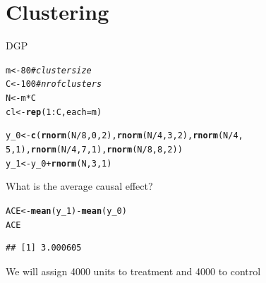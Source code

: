 \documentclass[12 pt]{article}\usepackage[]{graphicx}\usepackage[]{color}
\makeatletter
\newcommand{\hlnum}[1]{\textcolor[rgb]{0.686,0.059,0.569}{#1}}%
\newcommand{\hlcom}[1]{\textcolor[rgb]{0.678,0.584,0.686}{\textit{#1}}}%
\newcommand{\hlopt}[1]{\textcolor[rgb]{0,0,0}{#1}}%
\newcommand{\hlstd}[1]{\textcolor[rgb]{0.345,0.345,0.345}{#1}}%
\newcommand{\hlkwb}[1]{\textcolor[rgb]{0.69,0.353,0.396}{#1}}%
\newcommand{\hlkwc}[1]{\textcolor[rgb]{0.333,0.667,0.333}{#1}}%
\newcommand{\hlkwd}[1]{\textcolor[rgb]{0.737,0.353,0.396}{\textbf{#1}}}%
\newenvironment{kframe}{%
 \def\at@end@of@kframe{}%
 \ifinner\ifhmode%
  \def\at@end@of@kframe{\end{minipage}}%
  \begin{minipage}{\columnwidth}%
 \fi\fi%
 \def\FrameCommand##1{\hskip\@totalleftmargin \hskip-\fboxsep
 \colorbox{shadecolor}{##1}\hskip-\fboxsep
     \hskip-\linewidth \hskip-\@totalleftmargin \hskip\columnwidth}%
 \MakeFramed {\advance\hsize-\width
   \@totalleftmargin\z@ \linewidth\hsize
   \@setminipage}}%
 {\par\unskip\endMakeFramed%
 \at@end@of@kframe}
\newenvironment{knitrout}{}{} %
\makeatother
\begin{document}
\clearpage

\section*{Clustering}

DGP
\begin{knitrout}
\color{fgcolor}\begin{kframe}
\begin{alltt}
\hlstd{m} \hlkwb{<-} \hlnum{80}  \hlcom{# cluster size}
\hlstd{C} \hlkwb{<-} \hlnum{100}  \hlcom{# nr of clusters}
\hlstd{N} \hlkwb{<-} \hlstd{m} \hlopt{*} \hlstd{C}
\hlstd{cl} \hlkwb{<-} \hlkwd{rep}\hlstd{(}\hlnum{1}\hlopt{:}\hlstd{C,} \hlkwc{each} \hlstd{= m)}

\hlstd{y_0} \hlkwb{<-} \hlkwd{c}\hlstd{(}\hlkwd{rnorm}\hlstd{(N}\hlopt{/}\hlnum{8}\hlstd{,} \hlnum{0}\hlstd{,} \hlnum{2}\hlstd{),} \hlkwd{rnorm}\hlstd{(N}\hlopt{/}\hlnum{4}\hlstd{,} \hlnum{3}\hlstd{,} \hlnum{2}\hlstd{),} \hlkwd{rnorm}\hlstd{(N}\hlopt{/}\hlnum{4}\hlstd{,}
    \hlnum{5}\hlstd{,} \hlnum{1}\hlstd{),} \hlkwd{rnorm}\hlstd{(N}\hlopt{/}\hlnum{4}\hlstd{,} \hlnum{7}\hlstd{,} \hlnum{1}\hlstd{),} \hlkwd{rnorm}\hlstd{(N}\hlopt{/}\hlnum{8}\hlstd{,} \hlnum{8}\hlstd{,} \hlnum{2}\hlstd{))}
\hlstd{y_1} \hlkwb{<-} \hlstd{y_0} \hlopt{+} \hlkwd{rnorm}\hlstd{(N,} \hlnum{3}\hlstd{,} \hlnum{1}\hlstd{)}
\end{alltt}
\end{kframe}
\end{knitrout}

What is the average causal effect?
\begin{knitrout}
\color{fgcolor}\begin{kframe}
\begin{alltt}
\hlstd{ACE} \hlkwb{<-} \hlkwd{mean}\hlstd{(y_1)} \hlopt{-} \hlkwd{mean}\hlstd{(y_0)}
\hlstd{ACE}
\end{alltt}
\begin{verbatim}
## [1] 3.000605
\end{verbatim}
\end{kframe}
\end{knitrout}

We will assign 4000 units to treatment and 4000 to control
\end{document}
